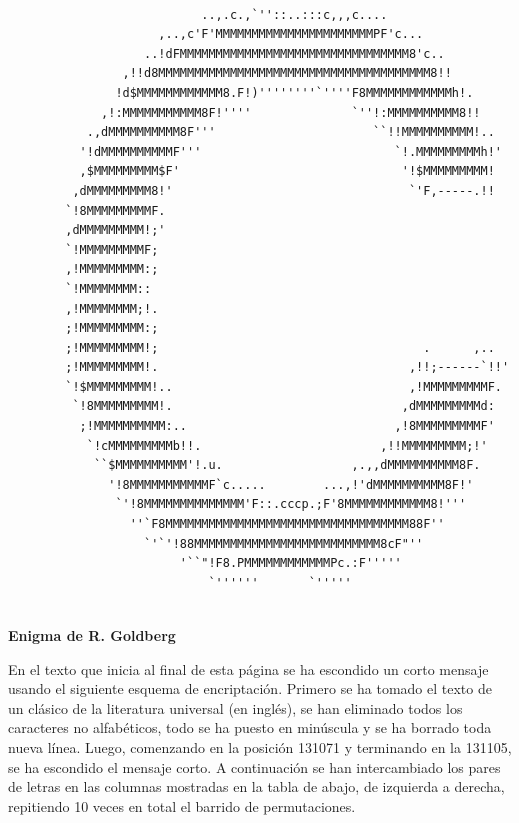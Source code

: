 \documentclass[11pt,letterpaper]{exam}
\begin{document}
\begin{questions}
\vfill

\begin{verbatim}
     
                           ..,.c.,`''::..:::c,,,c....
                     ,..,c'F'MMMMMMMMMMMMMMMMMMMMMMPF'c...
                   ..!dFMMMMMMMMMMMMMMMMMMMMMMMMMMMMMMMM8'c..
                ,!!d8MMMMMMMMMMMMMMMMMMMMMMMMMMMMMMMMMMMMMM8!!
               !d$MMMMMMMMMMMM8.F!)''''''''`''''F8MMMMMMMMMMMMh!.
             ,!:MMMMMMMMMMM8F!''''              `''!:MMMMMMMMMM8!!
           .,dMMMMMMMMMM8F'''                      ``!!MMMMMMMMMM!..
          '!dMMMMMMMMMMF'''                           `!.MMMMMMMMMh!'
          ,$MMMMMMMMM$F'                               '!$MMMMMMMMM!
         ,dMMMMMMMMM8!'                                 `'F,-----.!!
        `!8MMMMMMMMMF.
        ,dMMMMMMMMM!;'
        `!MMMMMMMMMF;
        ,!MMMMMMMMM:;
        `!MMMMMMMM::
        ,!MMMMMMMM;!.
        ;!MMMMMMMMM:;
        ;!MMMMMMMMM!;                                     .      ,..
        ;!MMMMMMMMM!.                                   ,!!;------`!!'
        `!$MMMMMMMMM!..                                 ,!MMMMMMMMMF.
         `!8MMMMMMMMM!.                                ,dMMMMMMMMMd:
          ;!MMMMMMMMMM:..                             ,!8MMMMMMMMMF'
           `!cMMMMMMMMMb!!.                         ,!!MMMMMMMMM;!'
            ``$MMMMMMMMMM'!.u.                  ,.,,dMMMMMMMMMM8F.
              '!8MMMMMMMMMMMF`c.....        ...,!'dMMMMMMMMMM8F!'
               `'!8MMMMMMMMMMMMMM'F::.cccp.;F'8MMMMMMMMMMMM8!'''
                 ''`F8MMMMMMMMMMMMMMMMMMMMMMMMMMMMMMMMMM88F''
                   `'`'!88MMMMMMMMMMMMMMMMMMMMMMMMMM8cF"''
                        '``"!F8.PMMMMMMMMMMMMPc.:F'''''
                            `''''''       `'''''
     

\end{verbatim}

\vfill

\newpage

\question[35] \textbf{Enigma de R. Goldberg}

En el texto que inicia al final de esta página se ha escondido un corto mensaje usando el siguiente esquema de encriptación. Primero se ha tomado el texto de un clásico de la literatura universal (en inglés), se han eliminado todos los caracteres no alfabéticos, todo se ha puesto en minúscula y se ha borrado toda nueva línea. Luego, comenzando en la posición 131071 y terminando en la 131105, se ha escondido el mensaje corto. A continuación se han intercambiado los pares de letras en las columnas mostradas en la tabla de abajo, de izquierda a derecha, repitiendo 10 veces en total el barrido de permutaciones.


\end{questions}
\end{document}
